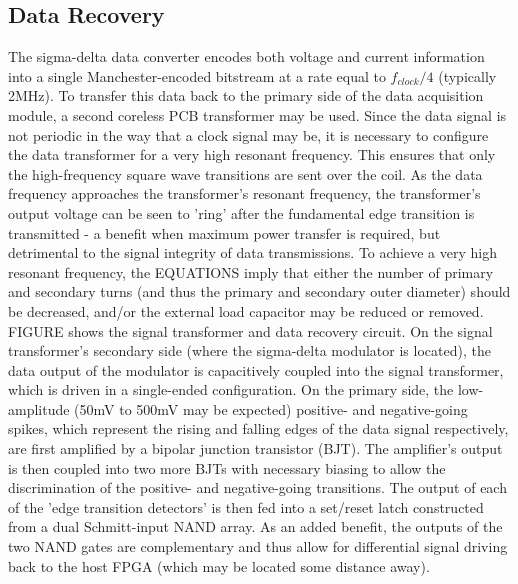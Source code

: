 \documentclass[conference]{IEEEtran}
\begin{document}
	\subsection{Data Recovery}
	The sigma-delta data converter encodes both voltage and current information into a single Manchester-encoded bitstream at a rate equal to $ f_{clock}/4 $ (typically 2MHz).  To transfer this data back to the primary side of the data acquisition module, a second coreless PCB transformer may be used.  Since the data signal is not periodic in the way that a clock signal may be, it is necessary to configure the data transformer for a very high resonant frequency.  This ensures that only the high-frequency square wave transitions are sent over the coil.  As the data frequency approaches the transformer's resonant frequency, the transformer's output voltage can be seen to 'ring' after the fundamental edge transition is transmitted - a benefit when maximum power transfer is required, but detrimental to the signal integrity of data transmissions.  To achieve a very high resonant frequency, the EQUATIONS imply that either the number of primary and secondary turns (and thus the primary and secondary outer diameter) should be decreased, and/or the external load capacitor may be reduced or removed.
	FIGURE shows the signal transformer and data recovery circuit.  On the signal transformer's secondary side (where the sigma-delta modulator is located), the data output of the modulator is capacitively coupled into the signal transformer, which is driven in a single-ended configuration.  On the primary side, the low-amplitude (50mV to 500mV may be expected) positive- and negative-going spikes, which represent the rising and falling edges of the data signal respectively, are first amplified by a bipolar junction transistor (BJT).  The amplifier's output is then coupled into two more BJTs with necessary biasing to allow the discrimination of the positive- and negative-going transitions.  The output of each of the 'edge transition detectors' is then fed into a set/reset latch constructed from a dual Schmitt-input NAND array.  As an added benefit, the outputs of the two NAND gates are complementary and thus allow for differential signal driving back to the host FPGA (which may be located some distance away).
	
\end{document}
